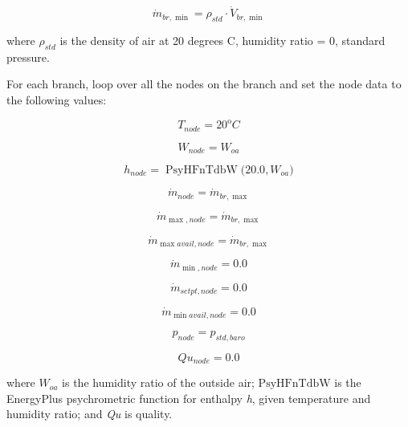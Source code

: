 \begin{equation}
{\dot m_{br,\min }} = {\rho_{std}} \cdot {\dot V_{br,\min }}
\end{equation}

where \({\rho_{std}}\) is the density of air at 20 degrees C, humidity ratio = 0, standard pressure.

For each branch, loop over all the nodes on the branch and set the node data to the following values:

\begin{equation}
{T_{node}} = {20^{\mathrm{o}}}C
\end{equation}

\begin{equation}
{W_{node}} = {W_{oa}}
\end{equation}

\begin{equation}
{h_{node}} = \operatorname{PsyHFnTdbW} {\mathrm{(}}20.0,{W_{oa}}{\mathrm{)}}
\end{equation}

\begin{equation}
{\dot m_{node}} = {\dot m_{br,\max }}
\end{equation}

\begin{equation}
{\dot m_{\max ,node}} = {\dot m_{br,\max }}
\end{equation}

\begin{equation}
{\dot m_{\max avail,node}} = {\dot m_{br,\max }}
\end{equation}

\begin{equation}
{\dot m_{\min ,node}} = 0.0
\end{equation}

\begin{equation}
{\dot m_{setpt,node}} = 0.0
\end{equation}

\begin{equation}
{\dot m_{\min avail,node}} = 0.0
\end{equation}

\begin{equation}
{p_{node}} = {p_{std,baro}}
\end{equation}

\begin{equation}
Q{u_{node}} = 0.0
\end{equation}

where \({W_{oa}}\) is the humidity ratio of the outside air; \({\mathrm{PsyHFnTdbW}}\) is the EnergyPlus psychrometric function for enthalpy \emph{h}, given temperature and humidity ratio; and \emph{Qu} is quality.


